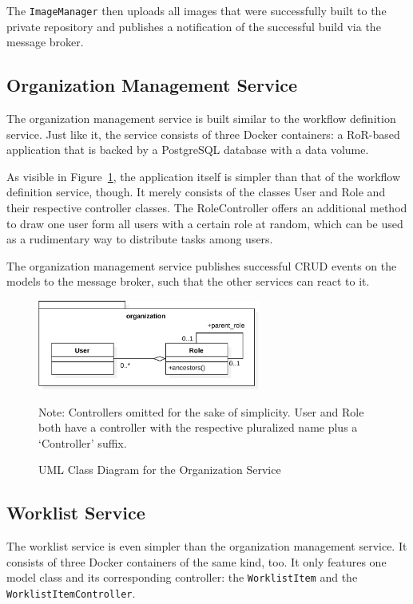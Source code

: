       The \texttt{ImageManager} then uploads all images that were successfully built to the private repository and publishes a notification of the successful build via the message broker.

  \subsection{Organization Management Service} %
    \label{sub:organization_management_service}
      The organization management service is built similar to the workflow definition service. Just like it, the service consists of three Docker containers: a \ac{RoR}-based application that is backed by a PostgreSQL database with a data volume.

      As visible in Figure~\ref{fig:uml_class_diagram_organization}, the application itself is simpler than that of the workflow definition service, though. It merely consists of the classes User and Role and their respective controller classes. The RoleController offers an additional method to draw one user form all users with a certain role at random, which can be used as a rudimentary way to distribute tasks among users.

      The organization management service publishes successful CRUD events on the models to the message broker, such that the other services can react to it.

    \begin{figure}[htbp]
      \centering
      \includegraphics[width=0.65\textwidth]{content/images/class_diagram_organization-crop.pdf}
      \caption*{\scriptsize Note: Controllers omitted for the sake of simplicity. User and Role both have a controller with the respective pluralized name plus a `Controller' suffix.}
      \caption{UML Class Diagram for the Organization Service}
      \label{fig:uml_class_diagram_organization}
    \end{figure}

  \subsection{Worklist Service} %
    \label{sub:worklist_service}
      The worklist service is even simpler than the organization management service. It consists of three Docker containers of the same kind, too. It only features one model class and its corresponding controller: the \texttt{WorklistItem} and the \texttt{WorklistItemController}.


